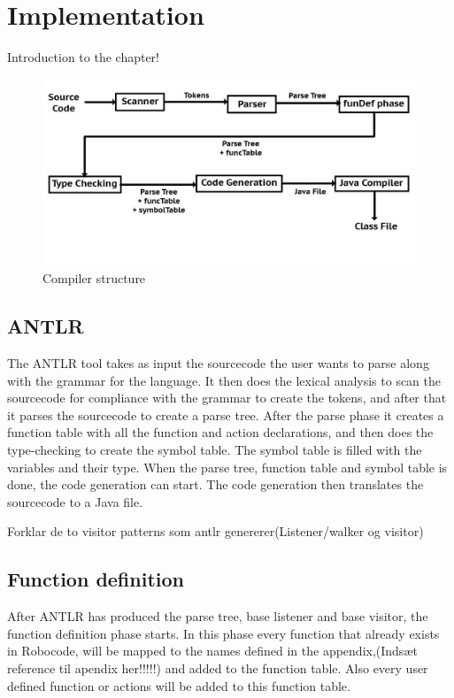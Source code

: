 \chapter{Implementation}
Introduction to the chapter!

\begin{figure}[!ht]
\centering
\includegraphics[scale=0.35]{billeder/compilerStructure}
\caption{Compiler structure}
\label{cs}
\end{figure}


\section{ANTLR}
The ANTLR tool takes as input the sourcecode the user wants to parse along with the grammar for the language. It then does the lexical analysis to scan the sourcecode for compliance with the grammar to create the tokens, and after that it parses the sourcecode to create a parse tree. After the parse phase it creates a function table with all the function and action declarations, and then does the type-checking to create the symbol table. The symbol table is filled with the variables and their type. When the parse tree, function table and symbol table is done, the code generation can start. The code generation then translates the sourcecode to a Java file. 

Forklar de to visitor patterns som antlr genererer(Listener/walker og visitor)


\section{Function definition}
After ANTLR has produced the parse tree, base listener and base visitor, the function definition phase starts. In this phase every function that already exists in Robocode, will be mapped to the names defined in the appendix,(Indsæt reference til apendix her!!!!!) and added to the function table. Also every user defined function or actions will be added to this function table. 

